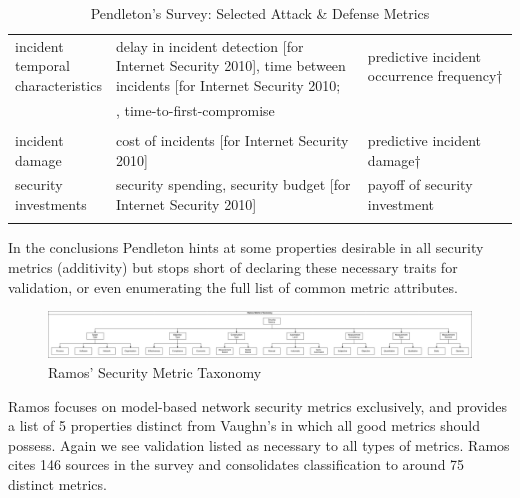 \begin{tiny}
\begin{longtable}{@{}|p{0.2\linewidth}|p{0.5\linewidth}|p{0.3\linewidth}|@{}}
incident temporal characteristics & delay in incident detection {[}for Internet Security 2010{]}, time between incidents {[}for Internet Security 2010; & predictive incident occurrence frequency† \\
 & \cite{Jonsson_Olovsson_1997, Madan_Gogeva-Popstojanova_Vaidyanathan_Trivedi_2002, Holm_2014}, time-to-first-compromise &  \\
 & \cite{Jonsson_Olovsson_1997,Madan_Gogeva-Popstojanova_Vaidyanathan_Trivedi_2002,Holm_2014} &  \\
incident damage & cost of incidents {[}for Internet Security 2010{]} & predictive incident damage† \\
security investments & security spending\cite{Chew_Swanson_Stine_Bartol_Brown_Robinson_2008}, security budget {[}for Internet Security 2010{]} & payoff of security investment \\* \bottomrule
\caption{Pendleton's Survey: Selected Attack \& Defense Metrics\cite{Pendleton_Garcia-Lebron_Cho_Xu_2016}}
\label{tab:pendleton_metrics}\\
\end{longtable}
\end{tiny}

In the conclusions Pendleton hints at some properties desirable in all security metrics (additivity) but stops short of declaring these necessary traits for validation, or even enumerating the full list of common metric attributes. 


\begin{figure}[ht]
\centering
\includegraphics[width=.95\linewidth]{resource/img/ch_background/cybok_metrics/ramos_taxonomy.png}
\caption{Ramos' Security Metric Taxonomy\cite{Ramos_Lazar_Filho_Rodrigues_2017}}
\label{fig:background:ramos_taxonomy}
\end{figure} 

Ramos\cite{Ramos_Lazar_Filho_Rodrigues_2017} focuses on model-based network security metrics exclusively, and provides a list of 5 properties distinct from Vaughn’s in \cite{Vaughn_Henning_Siraj_2003} which all good metrics should possess. Again we see validation listed as necessary to all types of metrics. Ramos cites 146 sources in the survey and consolidates classification to around 75 distinct metrics.

